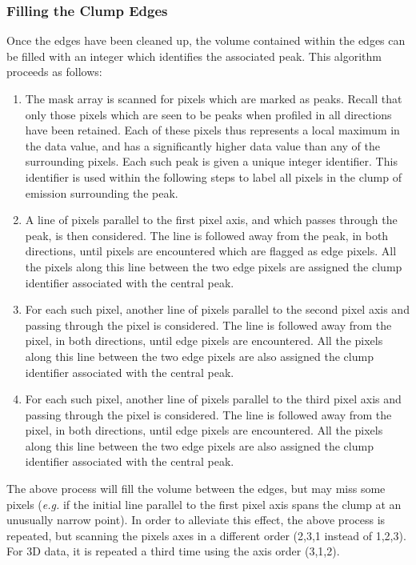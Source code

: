 \documentclass[twoside,11pt]{article}
\renewcommand{\_}{\texttt{\symbol{95}}}
\begin{document}
\subsubsection{Filling the Clump Edges}
Once the edges have been cleaned up, the volume contained within the
edges can be filled with an integer which identifies the associated peak.
This algorithm proceeds as follows:

\begin{enumerate}

\item The mask array is scanned for pixels which are marked as peaks.
Recall that only those pixels which are seen to be peaks when profiled
in all directions have been retained. Each of these pixels thus represents
a local maximum in the data value, and has a significantly higher data
value than any of the surrounding pixels. Each such peak is given a
unique integer identifier. This identifier is used within the following 
steps to label all pixels in the clump of emission surrounding the peak.

\item A line of pixels parallel to the first pixel axis, and which passes
through the peak, is then considered. The line is followed away from the
peak, in both directions, until pixels are encountered which are flagged as 
edge pixels. All the pixels along this line between the two edge pixels
are assigned the clump identifier associated with the central peak. 

\item For each such pixel, another line of pixels parallel to the second
pixel axis and passing through the pixel is considered. The line is followed 
away from the pixel, in both directions, until edge pixels are encountered.
All the pixels along this line between the two edge pixels are also assigned 
the clump identifier associated with the central peak. 

\item For each such pixel, another line of pixels parallel to the third
pixel axis and passing through the pixel is considered. The line is followed 
away from the pixel, in both directions, until edge pixels are encountered.
All the pixels along this line between the two edge pixels are also assigned 
the clump identifier associated with the central peak. 

\end{enumerate}

The above process will fill the volume between the edges, but may miss
some pixels (\emph{e.g.} if the initial line parallel to the first pixel
axis spans the clump at an unusually narrow point). In order to alleviate
this effect, the above process is repeated, but scanning the pixels axes
in a different order (2,3,1 instead of 1,2,3). For 3D data, it is repeated 
a third time using the axis order (3,1,2). 
\end{document}
